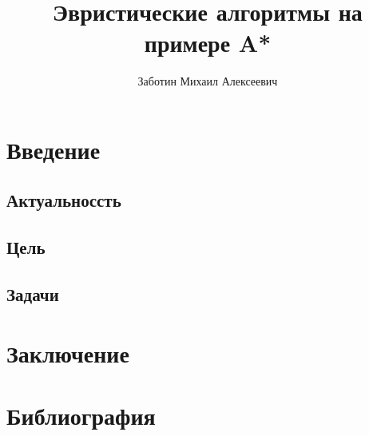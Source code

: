 \documentclass{article}
\author{Заботин Михаил Алексеевич}
\title{Эвристические алгоритмы на примере A*}
\begin{document}
	\begin{titlepage}
		\maketitle
	\end{titlepage}

	\section*{Введение}
		\subsection*{Актуальноссть}
		\subsection*{Цель}
		\subsection*{Задачи}
	\section*{Заключение}
	\section*{Библиография}
\end{document}
